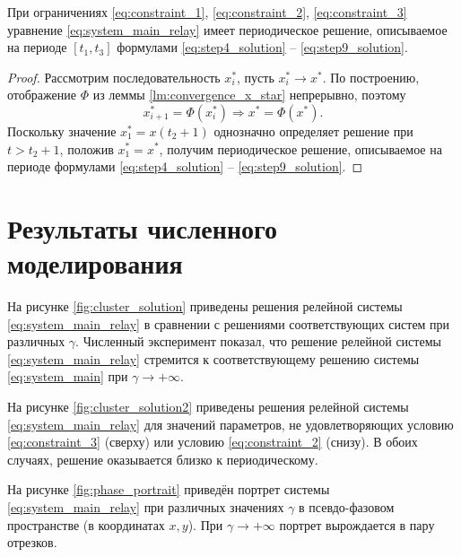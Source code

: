 \begin{theorem}
	\label{thm:periodic_relay_existence}
	При ограничениях \eqref{eq:constraint_1}, \eqref{eq:constraint_2}, \eqref{eq:constraint_3} уравнение \eqref{eq:system_main_relay} имеет периодическое решение, описываемое на периоде $[t_1, t_3]$ формулами \eqref{eq:step4_solution} -- \eqref{eq:step9_solution}.
\end{theorem}
\begin{proof}
	Рассмотрим последовательность $x^*_i$, пусть $x^*_i \to x^*$. По построению, отображение $\Phi$ из леммы \ref{lm:convergence_x_star} непрерывно, поэтому
	\[
	x^*_{i + 1} = \Phi(x^*_i) \Rightarrow x^* = \Phi(x^*).
	\]
	Поскольку значение $x^*_1 = x(t_2 + 1)$ однозначно определяет решение при $t > t_2 + 1$, положив $x^*_1 = x^*$, получим периодическое решение, описываемое на периоде формулами \eqref{eq:step4_solution} -- \eqref{eq:step9_solution}.
\end{proof}

\section{Результаты численного моделирования}\label{sec:ch3/sect5}

На рисунке \ref{fig:cluster_solution} приведены решения релейной системы \eqref{eq:system_main_relay} в сравнении с решениями соответствующих систем при различных $\gamma$. Численный эксперимент показал, что решение релейной системы \eqref{eq:system_main_relay} стремится к соответствующему решению системы \eqref{eq:system_main} при $\gamma \to +\infty$.

На рисунке \ref{fig:cluster_solution2} приведены решения релейной системы \eqref{eq:system_main_relay} для значений параметров, не удовлетворяющих условию \eqref{eq:constraint_3} (сверху) или условию \eqref{eq:constraint_2} (снизу). В обоих случаях, решение оказывается близко к периодическому.


На рисунке \ref{fig:phase_portrait} приведён портрет системы \eqref{eq:system_main_relay} при различных значениях $\gamma$ в псевдо-фазовом пространстве (в координатах $x, y$). При $\gamma \to +\infty$ портрет вырождается в пару отрезков.

